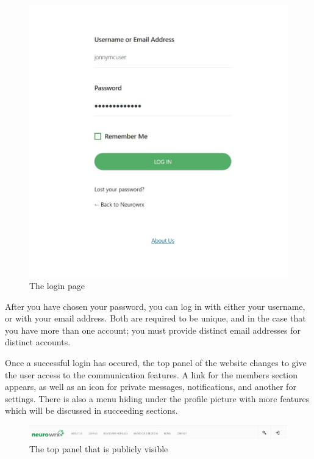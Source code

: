 \documentclass[10pt]{article}
\begin{document}
\begin{figure}[h]
    \centering
    \includegraphics[scale=0.3]{images/loginpage.jpg}
    \caption{The login page}
    \label{loginpage}
\end{figure}

\begin{flushleft}
After you have chosen your password, you can log in with either your username, or with your email address.  Both are required to be unique, and in the case that you have more than one account; you must provide distinct email addresses for distinct accounts. 
\end{flushleft}

\begin{flushleft}
Once a successful login has occured, the top panel of the website changes to give the user access to the communication features.  A link for the members section appears, as well as an icon for private messages, notifications, and another for settings.  There is also a menu hiding under the profile picture with more features which will be discussed in succeeding sections. 
\end{flushleft}

\begin{figure}[h]
    \centering
    \includegraphics[scale=0.3]{images/topbar.jpg}
    \caption{The top panel that is publicly visible}
    \label{topbar}
\end{figure}
\end{document}
